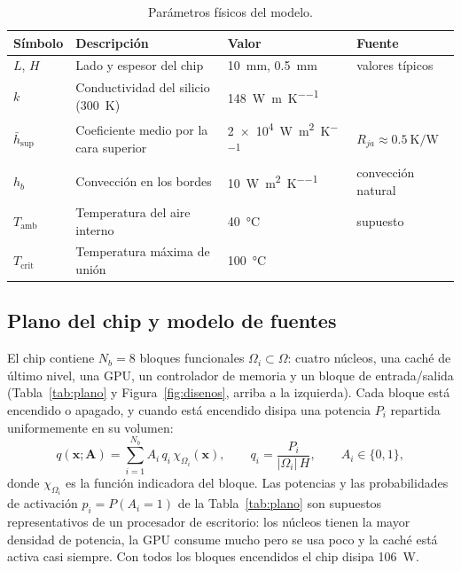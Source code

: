 \documentclass[preprint,11pt,sort&compress]{elsarticle}
\newcommand{\Tc}{T_{\mathrm{crit}}}
\newcommand{\Tamb}{T_{\mathrm{amb}}}
\renewcommand{\vec}[1]{\bm{#1}}
\begin{document}
\begin{table}[htbp]
\centering
\caption{Parámetros físicos del modelo.}
\label{tab:parametros}
\small
\begin{tabular}{@{}llll@{}}
\toprule
Símbolo & Descripción & Valor & Fuente \\
\midrule
$L$, $H$ & Lado y espesor del chip & \SI{10}{\milli\metre}, \SI{0.5}{\milli\metre} & valores típicos \\
$k$ & Conductividad del silicio (\SI{300}{\kelvin}) & \SI{148}{\watt\per\metre\per\kelvin} & \cite{glassbrenner1964} \\
$\bar h_{\mathrm{sup}}$ & Coeficiente medio por la cara superior & \SI{2e4}{\watt\per\metre\squared\per\kelvin} & $R_{ja}\approx\SI{0.5}{\kelvin\per\watt}$ \\
$h_b$ & Convección en los bordes & \SI{10}{\watt\per\metre\squared\per\kelvin} & convección natural \cite{incropera2007} \\
$\Tamb$ & Temperatura del aire interno & \SI{40}{\celsius} & supuesto \\
$\Tc$ & Temperatura máxima de unión & \SI{100}{\celsius} & \cite{intel_tjmax} \\
\bottomrule
\end{tabular}
\end{table}

\subsection{Plano del chip y modelo de fuentes}

El chip contiene $N_b=8$ bloques funcionales $\Omega_i\subset\Omega$: cuatro núcleos, una
caché de último nivel, una GPU, un controlador de memoria y un bloque de entrada/salida
(Tabla~\ref{tab:plano} y Figura~\ref{fig:disenos}, arriba a la izquierda). Cada bloque está
encendido o apagado, y cuando está encendido disipa una potencia $P_i$ repartida
uniformemente en su volumen:
\begin{equation}
  q(\vec x;\vec A) = \sum_{i=1}^{N_b} A_i\,q_i\,\chi_{\Omega_i}(\vec x),
  \qquad q_i=\frac{P_i}{|\Omega_i|\,H},
  \qquad A_i\in\{0,1\},
  \label{eq:fuente}
\end{equation}
donde $\chi_{\Omega_i}$ es la función indicadora del bloque. Las potencias y las
probabilidades de activación $p_i=P(A_i=1)$ de la Tabla~\ref{tab:plano} son supuestos
representativos de un procesador de escritorio: los núcleos tienen la mayor densidad de
potencia, la GPU consume mucho pero se usa poco y la caché está activa casi siempre. Con
todos los bloques encendidos el chip disipa \SI{106}{\watt}.
\end{document}

